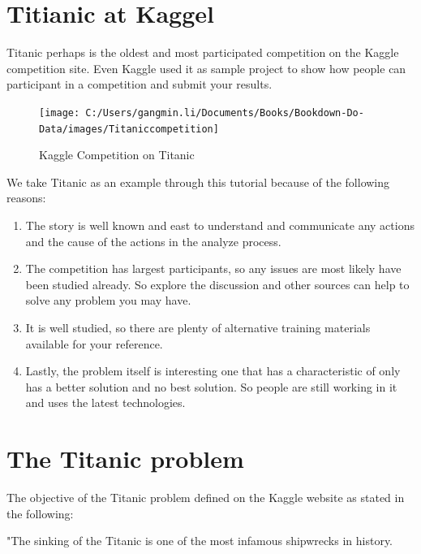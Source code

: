 \documentclass[
]{book}
\providecommand{\tightlist}{%
  \setlength{\itemsep}{0pt}\setlength{\parskip}{0pt}}
\begin{document}
\hypertarget{titianic-at-kaggel}{%
\section{Titianic at Kaggel}\label{titianic-at-kaggel}}

Titanic perhaps is the oldest and most participated competition on the Kaggle competition site. Even Kaggle used it as sample project to show how people can participant in a competition and submit your results.

\begin{figure}

{\centering \texttt{[image: C:/Users/gangmin.li/Documents/Books/Bookdown-Do-Data/images/Titaniccompetition]} 

}

\caption{Kaggle Competition on Titanic}\label{fig:unnamed-chunk-9}
\end{figure}

We take Titanic as an example through this tutorial because of the following reasons:

\begin{enumerate}
\def\labelenumi{\arabic{enumi}.}
\tightlist
\item
  The story is well known and east to understand and communicate any actions and the cause of the actions in the analyze process.
\item
  The competition has largest participants, so any issues are most likely have been studied already. So explore the discussion and other sources can help to solve any problem you may have.
\item
  It is well studied, so there are plenty of alternative training materials available for your reference.
\item
  Lastly, the problem itself is interesting one that has a characteristic of only has a better solution and no best solution. So people are still working in it and uses the latest technologies.
\end{enumerate}

\hypertarget{the-titanic-problem}{%
\section{The Titanic problem}\label{the-titanic-problem}}

The objective of the Titanic problem defined on the Kaggle website as stated in the following:

"The sinking of the Titanic is one of the most infamous shipwrecks in history.
\end{document}
